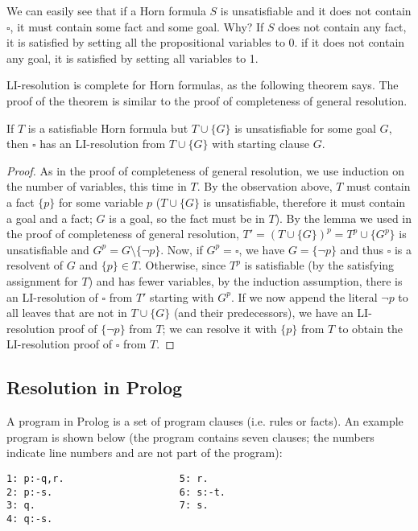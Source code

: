 We can easily see that if a Horn formula $S$ is unsatisfiable and it does not contain $\square$, it must contain some fact and some goal. Why? If $S$ does not contain any fact, it is satisfied by setting all the propositional variables to 0. if it does not contain any goal, it is satisfied by setting all variables to 1.

LI-resolution is complete for Horn formulas, as the following theorem says. The proof of the theorem is similar to the proof of completeness of general resolution.

\begin{theorem}
If $T$ is a satisfiable Horn formula but $T \cup \{G\}$ is unsatisfiable for some goal $G$, then $\square$ has an LI-resolution from $T \cup \{G\}$ with starting clause $G$.
\end{theorem}
\begin{proof}
As in the proof of completeness of general resolution, we use induction on the number of variables, this time in $T$. By the observation above, $T$ must contain a fact $\{p\}$ for some variable $p$ ($T \cup \{G\}$ is unsatisfiable, therefore it must contain a goal and a fact; $G$ is a goal, so the fact must be in $T$). By the lemma we used in the proof of completeness of general resolution, $T' = (T \cup \{G\})^p = T^p \cup \{G^p\}$ is unsatisfiable and $G^p = G \setminus \{\neg p\}$. Now, if $G^p = \square$, we have $G = \{\neg p\}$ and thus $\square$ is a resolvent of $G$ and $\{p\}\in T$. Otherwise, since $T^p$ is satisfiable (by the satisfying assignment for $T$) and has fewer variables, by the induction assumption, there is an LI-resolution of $\square$ from $T'$ starting with $G^p$. If we now append the literal $\neg p$ to all leaves that are not in $T \cup \{G\}$ (and their predecessors), we have an LI-resolution proof of $\{\neg p\}$ from $T$; we can resolve it with $\{p\}$ from $T$ to obtain the LI-resolution proof of $\square$ from $T$.
\end{proof}

\subsection{Resolution in Prolog}

A program in Prolog is a set of program clauses (i.e. rules or facts). An example program is shown below (the program contains seven clauses; the numbers indicate line numbers and are not part of the program):

\begin{verbatim}
1: p:-q,r.                    5: r.
2: p:-s.                      6: s:-t.
3: q.                         7: s.
4: q:-s.
\end{verbatim}

